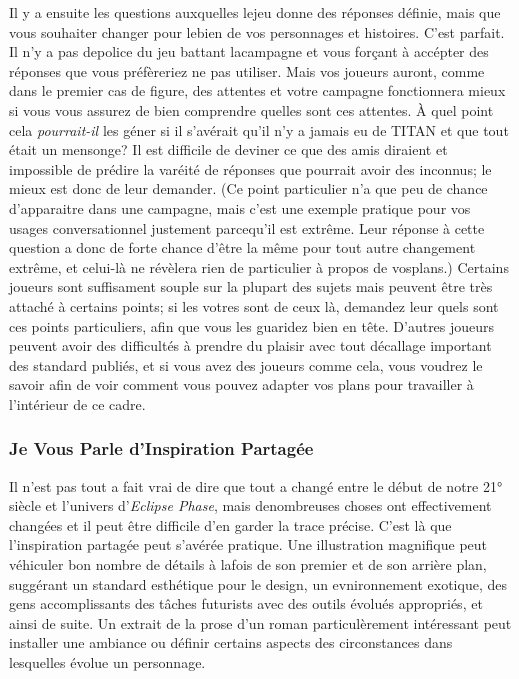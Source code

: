 {Il y a ensuite les questions auxquelles lejeu donne des réponses définie, mais que vous souhaiter changer pour lebien de vos personnages et histoires. C'est parfait. Il n'y a pas depolice du jeu battant lacampagne et vous forçant à accépter des réponses que vous préfèreriez ne pas utiliser. Mais vos joueurs auront, comme dans le premier cas de figure, des attentes et votre campagne fonctionnera mieux si vous vous assurez de bien comprendre quelles sont ces attentes. À quel point cela \textit{pourrait-il} les géner si il s'avérait qu'il n'y a jamais eu de TITAN et que tout était un mensonge? Il est difficile de deviner ce que des amis diraient et impossible de prédire la varéité de réponses que pourrait avoir  des inconnus; le mieux est donc de leur demander. (Ce point particulier n'a que peu de chance d'apparaitre dans une campagne, mais c'est une exemple pratique pour vos usages conversationnel justement parcequ'il est extrême. Leur réponse à cette question a donc de forte chance d'être la même pour tout autre changement extrême, et celui-là ne révèlera rien de particulier à propos de vosplans.) Certains joueurs sont suffisament souple sur la plupart des sujets mais peuvent être très attaché à certains points; si les votres sont de ceux là, demandez leur quels sont ces points particuliers, afin que vous les guaridez bien en tête. D'autres joueurs peuvent avoir des difficultés à prendre du plaisir avec tout décallage important des standard publiés, et si vous avez des joueurs comme cela, vous voudrez le savoir afin de voir comment vous pouvez adapter vos plans pour travailler à l'intérieur de ce cadre. 

\subsubsection{Je Vous Parle d'Inspiration Partagée} 

Il n'est pas tout a fait vrai de dire que tout a changé entre le début de notre 21° siècle et l'univers d'\textit{Eclipse Phase}, mais denombreuses choses ont effectivement changées et il peut être difficile d'en garder la trace précise. C'est là que l'inspiration partagée peut s'avérée pratique. Une illustration magnifique peut véhiculer bon nombre de détails à lafois de son premier et de son arrière plan, suggérant un standard esthétique pour le design, un evnironnement exotique, des gens accomplissants des tâches futurists avec des outils évolués appropriés, et ainsi de suite. Un extrait de la prose d'un roman particulèrement intéressant peut installer une ambiance ou définir certains aspects des circonstances dans lesquelles évolue un personnage. 

}

